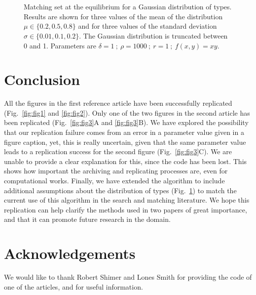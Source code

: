 \begin{figure}[!ht]
	\centering
	\quad
	\quad
	\quad
	\\
	\quad
	\quad
	\quad
	\\
	\quad
	\quad
	\quad
	\caption{Matching set at the equilibrium for a Gaussian distribution of types. Results are shown for three values of the mean of the distribution $\mu \in \{0.2,0.5,0.8\}$ and for three values of the standard deviation $\sigma \in \{0.01,0.1,0.2\}$. The Gaussian distribution is truncated between 0 and 1. Parameters are $\delta=1 \ ; \ \rho=1000 \ ; \ r=1 \ ; \ f(x,y)=xy$.}
	\label{fig:fig4}
\end{figure}




\section*{Conclusion}
All the figures in the first reference article \citep{shimer_assortative_2000} have been successfully replicated (Fig.~\ref{fig:fig1} and \ref{fig:fig2}). Only one of the two figures in the second article \citep{smith_marriage_2006} has been replicated (Fig.~\ref{fig:fig3}A and \ref{fig:fig3}B). We have explored the possibility that our replication failure comes from an error in a parameter value given in a figure caption, yet, this is really uncertain, given that the same parameter value leads to a replication success for the second figure (Fig.~\ref{fig:fig3}C). We are unable to provide a clear explanation for this, since the code has been lost. This shows how important the archiving and replicating processes are, even for computational works. Finally, we have extended the algorithm to include additional assumptions about the distribution of types (Fig.~\ref{fig:fig4}) to match the current use of this algorithm in the search and matching literature. We hope this replication can help clarify the methods used in two papers of great importance, and that it can promote future research in the domain.


\section*{Acknowledgements}
We would like to thank Robert Shimer and Lones Smith for providing the code of one of the articles, and for useful information.
